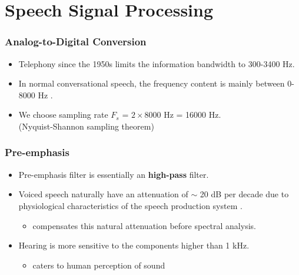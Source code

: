 \section{Speech Signal Processing}

\begin{frame}
\frametitle{Analog-to-Digital Conversion}
\begin{itemize}
\item Telephony since the 1950s limits the information bandwidth to 300-3400 Hz.
\item In normal conversational speech, the frequency content is mainly between 0-8000 Hz \cite{uysal2005bandwidth}.
\item We choose sampling rate $F_s$ = $2 \times 8000$ Hz = 16000 Hz.\\(Nyquist-Shannon sampling theorem)
\end{itemize}
\end{frame}


\begin{frame}
\frametitle{Pre-emphasis}
\begin{itemize}
\item Pre-emphasis filter is essentially an \textbf{high-pass} filter.
\vspace{15pt}
\item Voiced speech naturally have an attenuation of $\sim$ 20 dB per decade due to physiological characteristics of the speech production system \cite{picone1993signal}.
\begin{itemize}
\item compensates this natural attenuation before spectral analysis.
\end{itemize}
\vspace{15pt}
\item Hearing is more sensitive to the components higher than 1 kHz.
\begin{itemize}
\item caters to human perception of sound
\end{itemize}
\end{itemize}
\end{frame}



